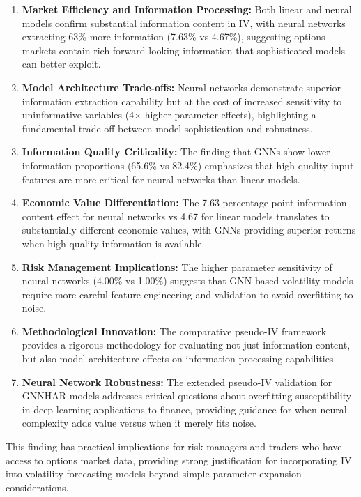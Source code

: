 \documentclass[12pt,a4paper]{article}
\begin{document}
\begin{enumerate}
\item \textbf{Market Efficiency and Information Processing:} Both linear and neural models confirm substantial information content in IV, with neural networks extracting 63\% more information (7.63\% vs 4.67\%), suggesting options markets contain rich forward-looking information that sophisticated models can better exploit.

\item \textbf{Model Architecture Trade-offs:} Neural networks demonstrate superior information extraction capability but at the cost of increased sensitivity to uninformative variables (4× higher parameter effects), highlighting a fundamental trade-off between model sophistication and robustness.

\item \textbf{Information Quality Criticality:} The finding that GNNs show lower information proportions (65.6\% vs 82.4\%) emphasizes that high-quality input features are more critical for neural networks than linear models.

\item \textbf{Economic Value Differentiation:} The 7.63 percentage point information content effect for neural networks vs 4.67 for linear models translates to substantially different economic values, with GNNs providing superior returns when high-quality information is available.

\item \textbf{Risk Management Implications:} The higher parameter sensitivity of neural networks (4.00\% vs 1.00\%) suggests that GNN-based volatility models require more careful feature engineering and validation to avoid overfitting to noise.

\item \textbf{Methodological Innovation:} The comparative pseudo-IV framework provides a rigorous methodology for evaluating not just information content, but also model architecture effects on information processing capabilities.

\item \textbf{Neural Network Robustness:} The extended pseudo-IV validation for GNNHAR models addresses critical questions about overfitting susceptibility in deep learning applications to finance, providing guidance for when neural complexity adds value versus when it merely fits noise.
\end{enumerate}

This finding has practical implications for risk managers and traders who have access to options market data, providing strong justification for incorporating IV into volatility forecasting models beyond simple parameter expansion considerations.
\end{document}
